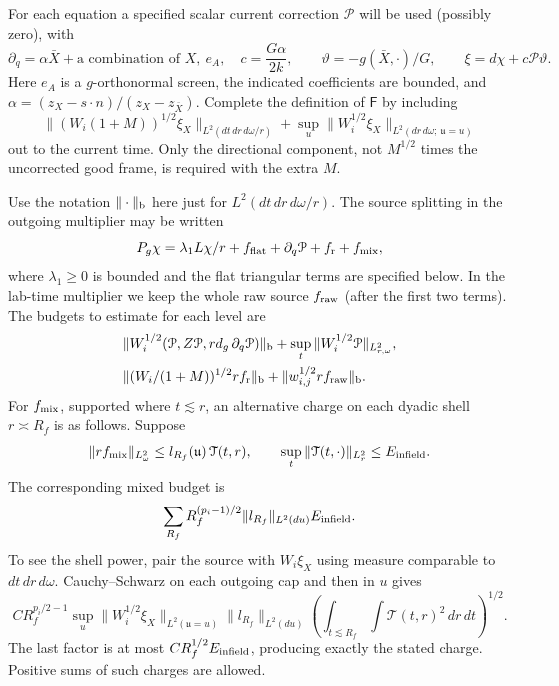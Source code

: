 For each equation a specified scalar current correction \(\mathcal P\) will be used (possibly zero), with
\begin{equation*}
\partial_q=\alpha\bar X+\text{a combination of }X,\ e_A,\quad
  c=\frac{G\alpha}{2k},\qquad
  \vartheta=-g(\bar X,\cdot)/G,\qquad
  \xi=d\chi+c\mathcal P\vartheta .
\end{equation*}
Here \(e_A\) is a \(g\)-orthonormal screen, the indicated coefficients are bounded, and \(\alpha=(z_X-s\cdot n)/(z_X-z_{\bar X})\). Complete the definition of \(\mathsf F\) by including
\begin{equation}\label{fe:F12}
\|(W_i(1+M))^{1/2}\xi_X\|_{L^2(dt\,dr\,d\omega/r)}
       +\sup_u\|W_i^{1/2}\xi_X\|_{L^2(dr\,d\omega;\ \mathfrak u=u)}
\end{equation}
out to the current time. Only the directional component, not \(M^{1/2}\) times the uncorrected good frame, is required with the extra \(M\).

Use the notation \(\|\cdot\|_{\rm b}\) here just for \(L^2(dt\,dr\,d\omega/r)\). The source splitting in the outgoing multiplier may be written
\begin{equation}\label{fe:F13}
P_g\chi=\lambda_1 L\chi/r+ f_{\rm flat}
                     +\partial_q\mathcal P+f_{\rm r}+f_{\rm mix},
\end{equation}
where \(\lambda_1\ge0\) is bounded and the flat triangular terms are specified below. In the lab-time multiplier we keep the whole raw source \(f_{\rm raw}\) (after the first two terms). The budgets to estimate for each level are
\begin{equation}\label{fe:F14}
\begin{split}
 &\|W_i^{1/2}(\mathcal P,Z\mathcal P,r d_g\,\partial_q\mathcal P)\|_{\rm b}
       +\sup_t\|W_i^{1/2}\mathcal P\|_{L^2_{r,\omega}},\\
 &\| (W_i/(1+M))^{1/2}r f_{\rm r}\|_{\rm b}
       +\|w_{i,j}^{1/2}r f_{\rm raw}\|_{\rm b}.
 \end{split}
\end{equation}
For \(f_{\rm mix}\), supported where \(t\lesssim r\), an alternative charge on each dyadic shell \(r\asymp R_f\) is as follows. Suppose
\begin{equation*}
\|r f_{\rm mix}\|_{L^2_\omega}
       \le l_{R_f}(\mathfrak u)\,\mathcal T(t,r),
            \qquad \sup_t\|\mathcal T(t,\cdot)\|_{L^2_r}
                          \le E_{\rm infield}.
\end{equation*}
The corresponding mixed budget is
\begin{equation}\label{fs:mixed-charge}
 \sum_{R_f}R_f^{(p_i-1)/2}
       \|l_{R_f}\|_{L^2(du)}E_{\rm infield}.
\end{equation}
To see the shell power, pair the source with $W_i\xi_X$ using measure
comparable to $dt\,dr\,d\omega$.  Cauchy--Schwarz on each outgoing cap
and then in $u$ gives
\begin{equation*}
 C R_f^{p_i/2-1}
 \sup_u\|W_i^{1/2}\xi_X\|_{L^2(\mathfrak u=u)}
 \|l_{R_f}\|_{L^2(du)}
 \left(\int_{t\lesssim R_f}\!\!\int\mathcal T(t,r)^2\,dr\,dt\right)^{1/2}.
\end{equation*}
The last factor is at most $C R_f^{1/2}E_{\rm infield}$, producing
exactly the stated charge. Positive sums of such charges are allowed.

